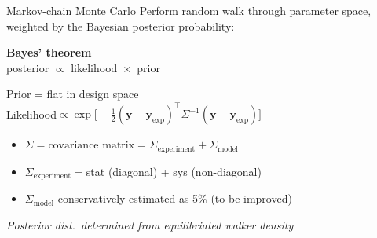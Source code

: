 \documentclass{beamer}
\newcommand{\tran}{^\intercal}
\begin{document}
\newcommand{\ydiff}{(\mathbf y - \mathbf y_\text{exp})}
%
\begin{frame}{Markov-chain Monte Carlo}
  \medskip
    Perform random walk through parameter space, weighted by the Bayesian posterior probability:
  \begin{center}
    \textbf{Bayes' theorem} \\
    posterior ${}\propto{}$ likelihood ${}\times{}$ prior
  \end{center}
  Prior = flat in design space \\[1ex]
  Likelihood${} \propto \exp\bigl[ -\frac{1}{2} \ydiff\tran \Sigma^{-1} \ydiff \bigr]$ \\[.5ex]
  \begin{itemize}
    \setlength{\itemsep}{.8ex}
    \item $\Sigma = \text{covariance matrix} = \Sigma_\text{experiment} + \Sigma_\text{model}$
    \item $\Sigma_\text{experiment} = {}$stat (diagonal) + sys (non-diagonal)
    \item $\Sigma_\text{model}$ conservatively estimated as 5\% (to be improved)
  \end{itemize}
  \smallskip
  \begin{tcolorbox}[width=\textwidth, colback=theme!10, colframe=theme!0]
    \emph{\color{theme} Posterior dist.\ determined from equilibriated walker density}
  \end{tcolorbox}
\end{frame}
\end{document}
